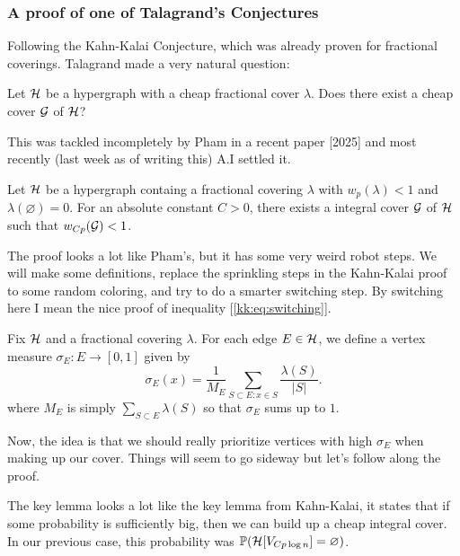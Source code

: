\subsubsection{A proof of one of Talagrand's Conjectures}

Following the Kahn-Kalai Conjecture, which was already proven for fractional
coverings. Talagrand made a very natural question:

\begin{question}
	Let $\mathcal{H}$ be a hypergraph with a cheap fractional cover $\lambda$.
	Does there exist a cheap cover $\mathcal{G}$ of $\mathcal{H}$?
\end{question}

This was tackled incompletely by Pham in a recent paper [2025] and most recently
(last week as of writing this) A.I settled it.

\begin{theorem}[Open A.I]
	Let $\mathcal{H}$ be a hypergraph containg a fractional covering $\lambda$
	with $w_p(\lambda) < 1$ and $\lambda(\varnothing) = 0$.
	For an absolute constant $C > 0$, there exists a integral cover $\mathcal{G}$ of $\mathcal{H}$
	such that $w_{Cp}(\mathcal{G}) < 1$.
\end{theorem}

The proof looks a lot like Pham's, but it has some very weird robot
steps. We will
make some definitions, replace the sprinkling steps in the Kahn-Kalai proof
to some random coloring, and try to do a smarter switching step. By switching
here I mean the nice proof of inequality [\ref{kk:eq:switching}].

\begin{definition}
	Fix $\mathcal{H}$ and a fractional covering $\lambda$.
	For each edge $E \in \mathcal{H}$, we define a vertex measure $\sigma_E : E \to [0,1]$
	given by
	\[
		\sigma_E(x) = \frac{1}{M_E} \sum_{S \subset E: x \in S} \frac{\lambda(S)}{|S|}.
	\]
	where $M_E$ is simply $\sum_{S \subset E}\lambda(S)$ so that
	$\sigma_E$ sums up to $1$.
\end{definition}

Now, the idea is that we should really prioritize vertices with high $\sigma_E$
when making up our cover. Things will seem to go sideway but let's
follow along the proof.

The key lemma looks a lot like the key lemma from Kahn-Kalai, it
states that if some probability
is sufficiently big, then we can build up a cheap integral cover.
In our previous case, this probability was $\mathbb{P}(\mathcal{H}[V_{Cp\log n}] =
\varnothing)$.

